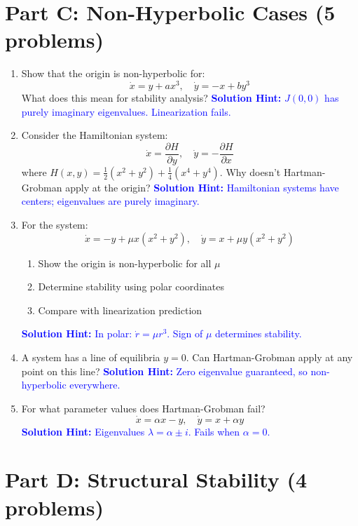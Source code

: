 \documentclass[12pt]{article}
\newcommand{\solution}[1]{\textcolor{blue}{\textbf{Solution Hint:} #1}}
\begin{document}
\section*{Part C: Non-Hyperbolic Cases (5 problems)}

\begin{enumerate}[resume]
\item Show that the origin is non-hyperbolic for:
$$\dot{x} = y + ax^3, \quad \dot{y} = -x + by^3$$
What does this mean for stability analysis?
\solution{$J(0,0)$ has purely imaginary eigenvalues. Linearization fails.}

\item Consider the Hamiltonian system:
$$\dot{x} = \frac{\partial H}{\partial y}, \quad \dot{y} = -\frac{\partial H}{\partial x}$$
where $H(x,y) = \frac{1}{2}(x^2 + y^2) + \frac{1}{4}(x^4 + y^4)$.
Why doesn't Hartman-Grobman apply at the origin?
\solution{Hamiltonian systems have centers; eigenvalues are purely imaginary.}

\item For the system:
$$\dot{x} = -y + \mu x(x^2 + y^2), \quad \dot{y} = x + \mu y(x^2 + y^2)$$
\begin{enumerate}[label=(\alph*)]
    \item Show the origin is non-hyperbolic for all $\mu$
    \item Determine stability using polar coordinates
    \item Compare with linearization prediction
\end{enumerate}
\solution{In polar: $\dot{r} = \mu r^3$. Sign of $\mu$ determines stability.}

\item A system has a line of equilibria $y = 0$. Can Hartman-Grobman apply at any point on this line?
\solution{Zero eigenvalue guaranteed, so non-hyperbolic everywhere.}

\item For what parameter values does Hartman-Grobman fail?
$$\dot{x} = \alpha x - y, \quad \dot{y} = x + \alpha y$$
\solution{Eigenvalues $\lambda = \alpha \pm i$. Fails when $\alpha = 0$.}
\end{enumerate}

\section*{Part D: Structural Stability (4 problems)}
\end{document}
